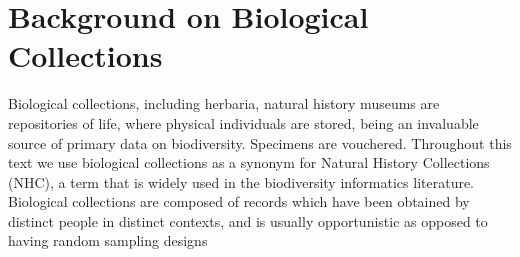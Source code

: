 \chapter{Background on Biological Collections}\label{biodiversity_data}

Biological collections, including herbaria, natural history museums are repositories of life, where physical individuals are stored, being an invaluable source of primary data on biodiversity.
Specimens are vouchered.
Throughout this text we use biological collections as a synonym for Natural History Collections (NHC), a term that is widely used in the biodiversity informatics literature.
Biological collections are composed of records which have been obtained by distinct people in distinct contexts, and is usually opportunistic as opposed to having random sampling designs %













